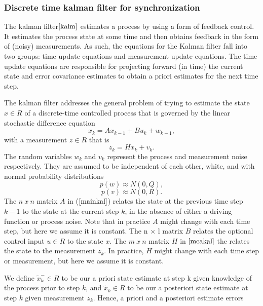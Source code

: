 \documentclass[journal]{IEEEtran}
\begin{document}
\subsubsection{\textbf{Discrete time kalman filter for synchronization}}
The kalman filter$\cite{kalm}$ estimates a process by using a form
of feedback control. It estimates the process state at some time and
then obtains feedback in the form of (noisy) measurements. As such,
the equations for the Kalman filter fall into two groups: time
update equations and measurement update equations. The time update
equations are responsible for projecting forward (in time) the
current state and error covariance estimates to obtain a priori
estimates for the next time step.
\par
The kalman filter addresses the general problem of trying to
estimate the state $x \in R$ of a discrete-time controlled process that is
governed by the linear stochastic difference equation
\begin{equation}
 x_k = Ax_{k-1} + Bu_k + w_{k-1} , \label{mainkal}
\end{equation}
with a measurement $z \in R$ that is
\begin{equation}
 z_k = Hx_k + v_k. \label{meakal}
\end{equation}
The random variables $w_k$ and $v_k$ represent the process and
measurement noise respectively. They are assumed to be
independent of each other, white, and with normal probability
distributions
\begin{equation}
 p(w) \approx N(0,Q),
\end{equation}
\begin{equation}
 p(v) \approx N(0,R).
\end{equation}
The $n\ x\ n$ matrix $A$ in ($\ref{mainkal}$) relates the state at
the previous time step $k-1$ to the state at the current step $k$,
in the absence of either a driving function or process noise. Note
that in practice $A$ might change with each time step, but here we
assume it is constant. The n × l matrix $B$ relates the optional
control input $u \in R$ to the state $x$. The $m\ x\ n$ matrix $H$
in $\ref{meakal}$ the relates the state to the measurement $z_k$. In
practice, $H$ might change with each time step or measurement, but
here we assume it is constant.
\par
We define $\tilde x_k^- \in R$ to be our a priori state estimate at
step k given knowledge of the process prior to step $k$, and $\tilde
x_k \in R$ to be our a posteriori state estimate at step $k$ given
measurement $z_k$. Hence, a priori and a posteriori estimate errors
\end{document}
